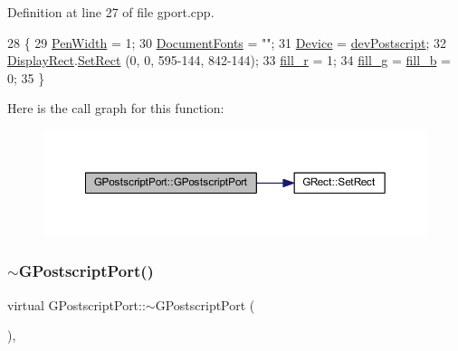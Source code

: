 Definition at line 27 of file gport.\+cpp.


\begin{DoxyCode}
28 \{
29     \mbox{\hyperlink{class_g_base_port_a9a76c3a8af8d0e9f29035d02d8f038c1}{PenWidth}} = 1;
30     \mbox{\hyperlink{class_g_postscript_port_adcdefa9db439190c69b85b171192e773}{DocumentFonts}} = \textcolor{stringliteral}{""};
31     \mbox{\hyperlink{class_g_base_port_a14275a027c8665d5fa4941e148a1b46a}{Device}} = \mbox{\hyperlink{gport_8h_a595e501a3b83fde14c760260fbfb153fa226f93689e7449ef4b2dd3d0efcb0809}{devPostscript}};
32     \mbox{\hyperlink{class_g_base_port_ac0e1180ebadeed5d3c7d0291db1bdf29}{DisplayRect}}.\mbox{\hyperlink{class_g_rect_a1fd6fd632b6d3c068382766a0c18340f}{SetRect}} (0, 0, 595-144, 842-144);
33     \mbox{\hyperlink{class_g_postscript_port_ab2a7d722f2cc8624ba2deccce41d287d}{fill\_r}} = 1;
34     \mbox{\hyperlink{class_g_postscript_port_a50c6a0edf2edfb66f6a57b7cf847f2e2}{fill\_g}} = \mbox{\hyperlink{class_g_postscript_port_a60fd8f27f76db55846837e93ccf5f582}{fill\_b}} = 0;
35 \}
\end{DoxyCode}
Here is the call graph for this function\+:\nopagebreak
\begin{figure}[H]
\begin{center}
\leavevmode
\includegraphics[width=350pt]{class_g_postscript_port_ad6dc52974d36561520b126452bd12e1f_cgraph}
\end{center}
\end{figure}
\mbox{\label{class_g_postscript_port_ac96c020bd52c420e954e7ea9faf4bc51}} 
\subsubsection{\texorpdfstring{$\sim$\+G\+Postscript\+Port()}{~GPostscriptPort()}}
{\footnotesize\ttfamily virtual G\+Postscript\+Port\+::$\sim$\+G\+Postscript\+Port (\begin{DoxyParamCaption}{ }\end{DoxyParamCaption})\hspace{0.3cm}{\ttfamily [inline]}, {\ttfamily [virtual]}}



